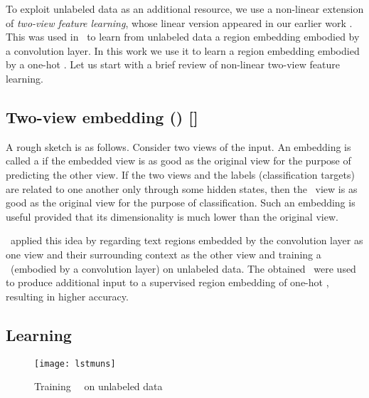\documentclass{article}
\begin{document}
To exploit unlabeled data as an additional resource, we use a non-linear extension of {\em two-view feature learning}, 
whose linear version appeared in our earlier work \cite{AZ05jmlr,AZ07}.  
This was used in \JZb\ to learn from unlabeled data a region embedding embodied by a convolution layer. 
In this work we use it to learn a region embedding embodied by a one-hot \lstm.   
Let us start with a brief review of non-linear two-view feature learning.   

\subsection{Two-view embedding (\tvEmb) [\JZb]} 
\label{sec:tvemb}
A rough sketch is as follows. 
Consider two views of the input.  
An embedding is called a {\em \tvEmb} if the embedded view is as good as the original view 
for the purpose of predicting the other view.  
If the two views and the labels (classification targets) are related to one another 
only through some hidden states, then the \tvEmbd\ view is as good as the original view 
for the purpose of classification.  Such an embedding is useful provided that its dimensionality is 
much lower than the original view.  

\JZb\ applied this idea by regarding text regions embedded by the convolution layer  
as one view and their surrounding context as the other view and training a \tvEmb\ (embodied by a convolution layer) 
on unlabeled data.  The obtained \tvEmbs\ were used to produce additional input to 
a supervised region embedding of one-hot \cnn,
resulting in higher accuracy.  


\subsection{Learning \lstm\ \tvEmbs} 

\begin{figure}[h]
\centering
\texttt{[image: lstmuns]}
\vskip -0.15in
\caption{\label{fig:lstmuns}
Training \lstm\ \tvEmbs\ on unlabeled data
}
\end{figure}
\end{document}

